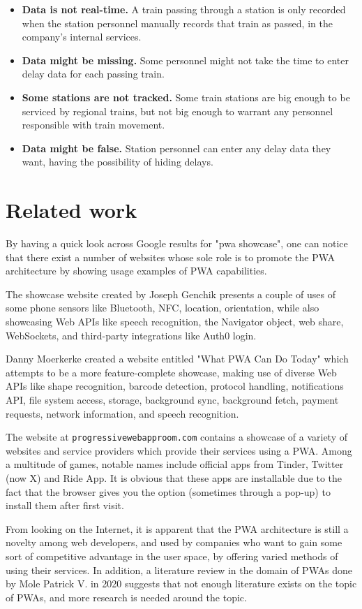 \begin{itemize}
    \item \textbf{Data is not real-time.} A train passing through a station is only recorded when the station personnel manually records that train as passed, in the company's internal services.
    \item \textbf{Data might be missing.} Some personnel might not take the time to enter delay data for each passing train.
    \item \textbf{Some stations are not tracked.} Some train stations are big enough to be serviced by regional trains, but not big enough to warrant any personnel responsible with train movement.
    \item \textbf{Data might be false.} Station personnel can enter any delay data they want, having the possibility of hiding delays.
\end{itemize}

\section{Related work}

By having a quick look across Google results for "pwa showcase", one can notice that there exist a number of websites whose sole role is to promote the PWA architecture by showing usage examples of PWA capabilities.

The showcase website created by Joseph Genchik \cite{GenchikPWAShowcase} presents a couple of uses of some phone sensors like Bluetooth, NFC, location, orientation, while also showcasing Web APIs like speech recognition, the Navigator object, web share, WebSockets, and third-party integrations like Auth0 login.

Danny Moerkerke created a website entitled "What PWA Can Do Today" \cite{MoerkerkePWAShowcase} which attempts to be a more feature-complete showcase, making use of diverse Web APIs like shape recognition, barcode detection, protocol handling, notifications API, file system access, storage, background sync, background fetch, payment requests, network information, and speech recognition.

The website at \verb|progressivewebapproom.com| \cite{PWARoom} contains a showcase of a variety of websites and service providers which provide their services using a PWA. Among a multitude of games, notable names include official apps from Tinder, Twitter (now X) and Ride App. It is obvious that these apps are installable due to the fact that the browser gives you the option (sometimes through a pop-up) to install them after first visit.

From looking on the Internet, it is apparent that the PWA architecture is still a novelty among web developers, and used by companies who want to gain some sort of competitive advantage in the user space, by offering varied methods of using their services. In addition, a literature review in the domain of PWAs done by Mole Patrick V. in 2020 \cite{MoleLitRev} suggests that not enough literature exists on the topic of PWAs, and more research is needed around the topic.
